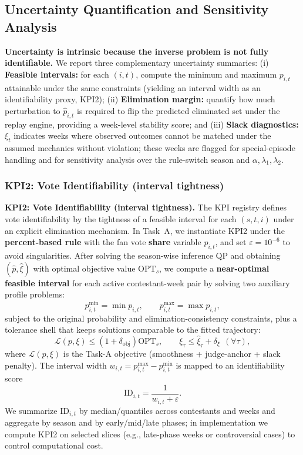 \subsection{Uncertainty Quantification and Sensitivity Analysis}\label{subsec:uncertainty_qualification_and_sensitivity_analysis}
\textbf{Uncertainty is intrinsic because the inverse problem is not fully identifiable.}
We report three complementary uncertainty summaries:
(i) \textbf{Feasible intervals:} for each $(i,t)$, compute the minimum and maximum $p_{i,t}$ attainable under the same constraints (yielding an interval width as an identifiability proxy, KPI2);
(ii) \textbf{Elimination margin:} quantify how much perturbation to $\hat p_{i,t}$ is required to flip the predicted eliminated set under the replay engine, providing a week-level stability score; and
(iii) \textbf{Slack diagnostics:} $\xi_t$ indicates weeks where observed outcomes cannot be matched under the assumed mechanics without violation; these weeks are flagged for special-episode handling and for sensitivity analysis over the rule-switch season and $\alpha,\lambda_1,\lambda_2$.


\subsubsection{KPI2: Vote Identifiability (interval tightness)}\label{subsubsec:kpi2_identifiability}

\textbf{KPI2: Vote Identifiability (interval tightness).}
The KPI registry defines vote identifiability by the tightness of a feasible interval for each $(s,t,i)$ under an explicit elimination mechanism.
In Task~A, we instantiate KPI2 under the \textbf{percent-based rule} with the fan vote \textbf{share} variable $p_{i,t}$, and set $\varepsilon=10^{-6}$ to avoid singularities.
After solving the season-wise inference QP and obtaining $(\hat p,\hat\xi)$ with optimal objective value $\mathrm{OPT}_s$, we compute a \textbf{near-optimal feasible interval} for each active contestant-week pair by solving two auxiliary profile problems:
\[
p^{\min}_{i,t}=\min p_{i,t},\qquad p^{\max}_{i,t}=\max p_{i,t},
\]
subject to the original probability and elimination-consistency constraints, plus a tolerance shell that keeps solutions comparable to the fitted trajectory:
\[
\mathcal{L}(p,\xi)\le (1+\delta_{\mathrm{obj}})\mathrm{OPT}_s,\qquad \xi_\tau \le \hat\xi_\tau+\delta_\xi \ \ (\forall \tau),
\]
where $\mathcal{L}(p,\xi)$ is the Task-A objective (smoothness + judge-anchor + slack penalty).
The interval width $w_{i,t}=p^{\max}_{i,t}-p^{\min}_{i,t}$ is mapped to an identifiability score
\[
\mathrm{ID}_{i,t}=\frac{1}{w_{i,t}+\varepsilon}.
\]
We summarize $\mathrm{ID}_{i,t}$ by median/quantiles across contestants and weeks and aggregate by season and by early/mid/late phases; in implementation we compute KPI2 on selected slices (e.g., late-phase weeks or controversial cases) to control computational cost.

